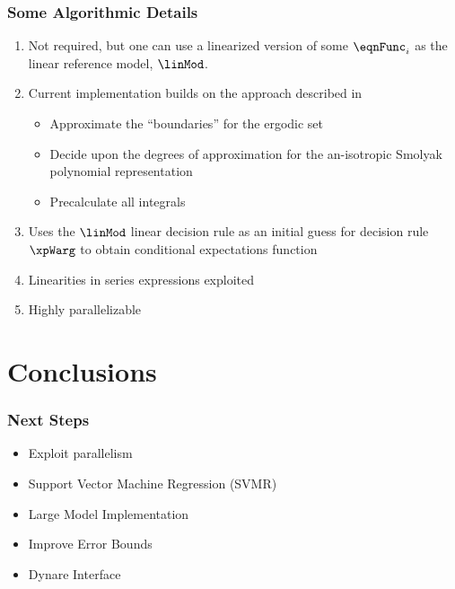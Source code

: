 \documentclass[notheorems]{beamer}
\begin{document}
\begin{frame}
  \frametitle{Some Algorithmic Details}
  


\begin{enumerate}
\item Not required, but one can use a linearized version of some $\eqnFunc_i$  as the  linear reference model, $\linMod$.
\item Current implementation builds on the approach described in \cite{Judd2014}
  \begin{itemize}
  \item Approximate the ``boundaries'' for the ergodic set
  \item Decide upon the degrees of approximation for the an-isotropic Smolyak polynomial representation
  \item Precalculate all integrals
  \end{itemize}
\item Uses the $\linMod$ linear decision rule as an initial guess for decision rule $\xpWarg$ to obtain conditional expectations function
\item Linearities in series expressions exploited
\item Highly parallelizable 
\end{enumerate}


\end{frame}







\section{Conclusions}
\label{sec:conclusions}


\begin{frame}
  \frametitle{Next Steps}
\begin{itemize}
\item Exploit parallelism
\item Support Vector Machine Regression (SVMR)
\item Large Model Implementation
\item Improve Error Bounds
\item Dynare Interface
\end{itemize}

\end{frame}





\end{document}
